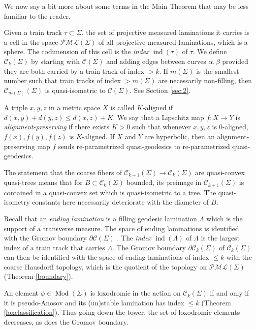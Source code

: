 \documentclass[11pt]{article}
\theoremstyle{remark}
\def\PML{{\mathcal{PML}}}
\def\C{{\mathcal C}}
\def\Mod{\operatorname{Mod}}
\def\ind{\operatorname{ind}}
\begin{document}
We now say a bit more about some terms in
the Main Theorem that may be less familiar to the reader.

Given a train track $\tau\subset\Sigma$, the set of projective
measured laminations it carries is a cell in the space $\PML(\Sigma)$
of all projective measured laminations, which is a sphere. The
codimension of this cell is the {\it index} $\ind(\tau)$ of $\tau$. We
define $\C_k(\Sigma)$ by starting with $\C(\Sigma)$ and adding edges
between curves $\alpha,\beta$ provided they are both carried by a
train track of index $>k$. If $m(\Sigma)$ is the smallest number such
that train tracks of index $>m(\Sigma)$ are necessarily non-filling,
then $\C_{m(\Sigma)}(\Sigma)$ is quasi-isometric to $\C(\Sigma)$. See Section
\ref{sec:2}.

A triple $x,y,z$ in a metric space $X$
is called $K$-aligned if $d(x,y)+d(y,z) \leq d(x,z) + K$.
We say that a Lipschitz map $f:X\to Y$ is \emph{alignment-preserving} if
there exists $K>0$ such that whenever $x,y,z$ is $0$-aligned, $f(x),f(y),f(z)$
is $K$-aligned. If $X$ and $Y$ are hyperbolic, then an
alignment-preserving map $f$ sends
re-parametrized quasi-geodesics
to re-parametrized quasi-geodesics.

The statement that the coarse fibers of $\C_{k+1}(\Sigma) \to\C_k(\Sigma)$ are
quasi-convex quasi-trees means that for $B\subset \C_k(\Sigma)$ bounded,
its preimage in $\C_{k+1}(\Sigma)$ is contained in a quasi-convex set
which is quasi-isometric to a tree. The quasi-isometry constants
here necessarily deteriorate with the diameter of $B$.

Recall that an \emph{ending lamination} is a filling geodesic
lamination $\Lambda$ which is the support of a transverse measure. The space of
ending laminations is identified with the Gromov boundary $\partial\C(\Sigma)$
\cite{klarreich}.
The \emph{index} $\ind(\Lambda)$ of $\Lambda$ is the
largest index of a train track that carries $\Lambda$. The Gromov
boundary $\partial\C_k(\Sigma)$ of $\C_k(\Sigma)$ can then be identified with the
space of ending laminations of index $\leq k$ with the
coarse Hausdorff topology, which is the quotient of the topology on $\PML(\Sigma)$
(Theorem \ref{boundary}).

An element $\phi\in \Mod(\Sigma)$ is loxodromic in the action on $\C_k(\Sigma)$ if and only
if it is pseudo-Anosov and its (un)stable lamination has index $\leq
  k$ (Theorem \ref{loxclassification}).
Thus going down the tower, the set of loxodromic elements decreases, as does
the Gromov boundary.
\end{document}
